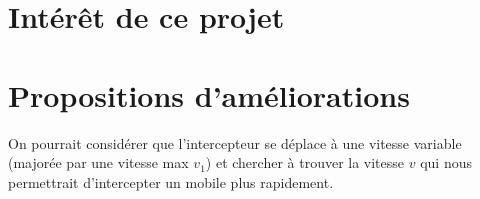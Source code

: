 \section{Intérêt de ce projet}
\section{Propositions d'améliorations}

On pourrait considérer que l'intercepteur se déplace à une vitesse variable (majorée par une vitesse max $v_1$) et chercher à trouver la vitesse $v$ qui nous permettrait d'intercepter un mobile plus rapidement.
